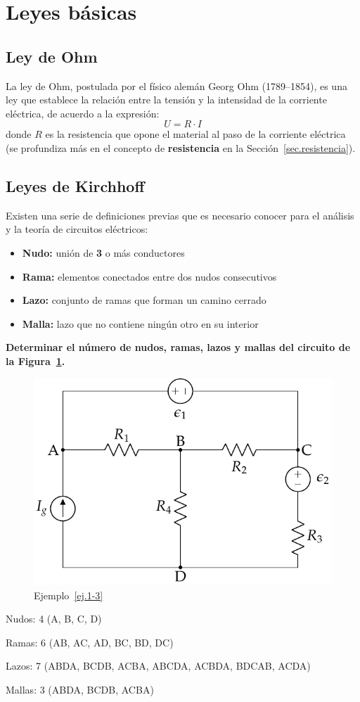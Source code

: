 	\section{Leyes básicas}
	
	\subsection{Ley de Ohm}
	
	La ley de Ohm, postulada por el físico  alemán Georg Ohm (1789--1854), es una ley que establece la relación entre la tensión y la intensidad de la corriente eléctrica, de acuerdo a la expresión: 
	\begin{equation}
	   \boxed{ U=R\cdot I}
	\end{equation}
    donde $R$ es la resistencia que opone el material al paso de la corriente eléctrica (se profundiza más en el concepto de \textbf{resistencia} en la Sección~\ref{sec.resistencia}).
	
	\subsection{Leyes de Kirchhoff}
	
	Existen una serie de definiciones previas que es necesario conocer para el análisis y la teoría de circuitos eléctricos:
	\begin{itemize}
		\item \textbf{Nudo:} unión de \textbf{3} o más conductores
		\item \textbf{Rama:} elementos conectados entre dos nudos consecutivos
		\item \textbf{Lazo:} conjunto de ramas que forman un camino cerrado
		\item \textbf{Malla:} lazo que no contiene ningún otro en su interior
	\end{itemize}

	\begin{example}\label{ej.1-3}
		\textbf{Determinar el número de nudos, ramas, lazos y mallas del circuito de la Figura~\ref{fig.mallas}.}
		\begin{figure}[H]
			\centering
			\includegraphics[width=0.5\linewidth]{../figs/mallas.pdf}
			\caption{Ejemplo~\ref{ej.1-3}}
			\label{fig.mallas}
		\end{figure}
		
		Nudos: 4 (A, B, C, D)
		
		Ramas: 6 (AB, AC, AD, BC, BD, DC)
		
		Lazos: 7 (ABDA, BCDB, ACBA, ABCDA, ACBDA, BDCAB, ACDA) 
		
		Mallas: 3 (ABDA, BCDB, ACBA)
	\end{example}
	
